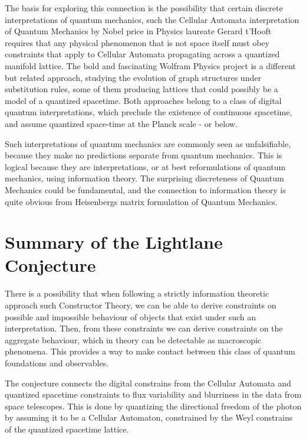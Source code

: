 \documentclass[notitlepage]{article}
\begin{document}
The basis for exploring this connection is the possibility that certain discrete interpretations of quantum mechanics, such the Cellular Automata interpretation of Quantum Mechanics \cite{hooft2014cellular} by Nobel price in Physics laureate Gerard t'Hooft requires that any physical phenomenon that is not space itself must obey constraints that apply to Cellular Automata propagating across a quantized manifold lattice. The bold and fascinating Wolfram Physics project \cite{Wolfram2020} is a different but related approach, studying the evolution of graph structures under substitution rules, some of them producing lattices that could possibly be a model of a quantized spacetime. Both approaches belong to a class of digital quantum interpretations, which  preclude the existence of continuous spacetime, and assume quantized space-time at the Planck scale - or below.

Such interpretations of quantum mechanics are commonly seen as unfalsifiable, because they  make no predictions separate from quantum mechanics. This is logical because they are interpretations, or at best reformulations of quantum mechanics, using information theory. The surprising discreteness of Quantum Mechanics could be fundamental, and the connection to information theory is quite obvious from Heisenbergs matrix formulation of Quantum Mechanics. 


\section{Summary of the Lightlane Conjecture}
There is a possibility that when following a strictly information theoretic approach such Constructor Theory, we can be able to derive constraints on possible and impossible behaviour of objects that exist under such an interpretation. Then, from these constraints we can derive constraints on the aggregate behaviour, which in theory can be detectable as macroscopic phenomena. This provides a way to make contact between this class of quantum foundations and observables. 

The conjecture connects the digital constrains from the Cellular Automata and quantized spacetime constraints to flux variability and blurriness in the data from space telescopes. This is done by quantizing the directional freedom of the photon by assuming it to be a Cellular Automaton, constrained by the Weyl constrains of the quantized spacetime lattice. 
\end{document}
